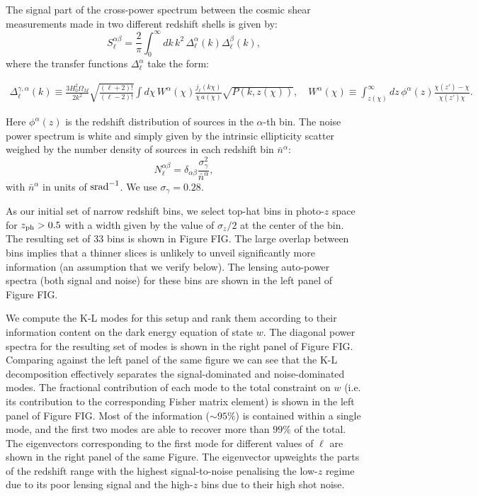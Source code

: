 \documentclass[twocolumn,amsfont,amssymb,amsmath, showpacs,balancelastpage, nofootinbib]{revtex4-1}
\begin{document}
    The signal part of the cross-power spectrum between the cosmic shear measurements made in two different redshift shells is given by:
    \begin{equation}
      S^{\alpha\beta}_\ell=\frac{2}{\pi}\int_0^\infty dk\,k^2\,\Delta^\alpha_\ell(k)\Delta^\beta_\ell(k),
    \end{equation}
    where the transfer functions $\Delta^{\alpha}_\ell$ take the form:
    \begin{widetext}
    \begin{align}
      \Delta^{\gamma,\alpha}_\ell(k)\equiv\frac{3H_0^2\Omega_M}{2k^2}\sqrt{\frac{(\ell+2)!}{(\ell-2)!}}\int d\chi\,W^\alpha(\chi)\frac{j_\ell(k\chi)}{\chi\,a(\chi)}\sqrt{P(k,z(\chi))},\hspace{12pt}
      W^\alpha(\chi)\equiv\int_{z(\chi)}^\infty dz\,\phi^\alpha(z)\frac{\chi(z')-\chi}{\chi(z')\chi}.
    \end{align}
    \end{widetext}
    Here $\phi^\alpha(z)$ is the redshift distribution of sources in the $\alpha$-th bin. The noise power spectrum is white and simply given by the intrinsic ellipticity scatter weighed by the number density of sources in each redshift bin $\bar{n}^\alpha$:
    \begin{equation}
      N^{\alpha\beta}_\ell=\delta_{\alpha\beta}\frac{\sigma_\gamma^2}{\bar{n}^\alpha},
    \end{equation}
    with $\bar{n}^\alpha$ in units of ${\rm srad}^{-1}$. We use $\sigma_\gamma=0.28$.
    
    As our initial set of narrow redshift bins, we select top-hat bins in photo-$z$ space for $z_{\rm ph}>0.5$ with a width given by the value of $\sigma_z/2$ at the center of the bin. The resulting set of 33 bins is shown in Figure FIG. The large overlap between bins implies that a thinner slices is unlikely to unveil significantly more information (an assumption that we verify below). The lensing auto-power spectra (both signal and noise) for these bins are shown in the left panel of Figure FIG.
    
    We compute the K-L modes for this setup and rank them according to their information content on the dark energy equation of state $w$. The diagonal power spectra for the resulting set of modes is shown in the right panel of  Figure FIG.  Comparing against the left panel of the same figure we can see that the K-L decomposition effectively separates the signal-dominated and noise-dominated modes. The fractional contribution of each mode to the total constraint on $w$ (i.e. its contribution to the corresponding Fisher matrix element) is shown in the left panel of Figure FIG. Most of the information ($\sim95\%$) is contained within a single mode, and the first two modes are able to recover more than $99\%$ of the total. The eigenvectors corresponding to the first mode for different values of $\ell$ are shown in the right panel of the same Figure. The eigenvector upweights the parts of the redshift range with the highest signal-to-noise penalising the low-$z$ regime due to its poor lensing signal and the high-$z$ bins due to their high shot noise.
\end{document}
